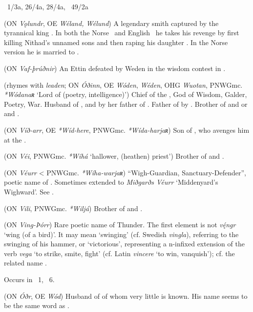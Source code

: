 \begin{itemize}
  \Voluspa\ 1/3a, 26/4a, 28/4a, \Grimnismal\ 49/2a

 (ON \emph{Vǫlundr}, OE \emph{Wéland, Wélund})
  A legendary smith captured by the tyrannical king .  In both the Norse \Volundarkvida\ and English \Deor\ he takes his revenge by first killing Nithad’s unnamed sons and then raping his daughter .  In the Norse version he is married to .

 (ON \emph{Vaf-þrúðnir})
  An Ettin defeated by Weden in the wisdom contest in \Vafthrudnismal.

 (rhymes with \emph{leaden}; ON \emph{Óðinn}, OE \emph{Wóden}, \emph{Wéden}, OHG \emph{Wuotan}, PNWGmc. \emph{*Wódanaʀ} ‘Lord of  (poetry, intelligence)’)
  Chief of the , God of Wisdom, Galder, Poetry, War.  Husband of , and by her father of .  Father of  by .  Brother of  and  or  and .

 (ON \emph{Víð-arr}, OE \emph{*Wíd-here}, PNWGmc. \emph{*Wída-harjaʀ})
  Son of , who avenges him at the .

 (ON \emph{Véi}, PNWGmc. \emph{*Wíhá} ‘hallower, (heathen) priest’)
  Brother of  and .

 (ON \emph{Véurr} < PNWGmc. \emph{*Wíha-warjaʀ})
  “Wigh-Guardian, Sanctuary-Defender”, poetic name of .  Sometimes extended to \emph{Miðgarðs Véurr} ‘Middenyard’s Wighward’.  See .

 (ON \emph{Vili}, PNWGmc. \emph{*Wiljá})
  Brother of  and .

 (ON \emph{Ving-Þórr})
  Rare poetic name of Thunder.  The first element is not \emph{vę́ngr} ‘wing (of a bird)’.  It may mean ‘swinging’ (cf. Swedish \emph{vingla}), referring to the swinging of his hammer, or ‘victorious’, representing a n-infixed extension of the verb \emph{vega} ‘to strike, smite, fight’ (cf. Latin \emph{vincere} ‘to win, vanquish’); cf. the related name .

  Occurs in \Thrymskvida\ 1, \Allvismal\ 6.

 (ON \emph{Óðr}, OE \emph{Wód})
  Husband of  of whom very little is known.  His name seems to be the same word as .


\end{itemize}

